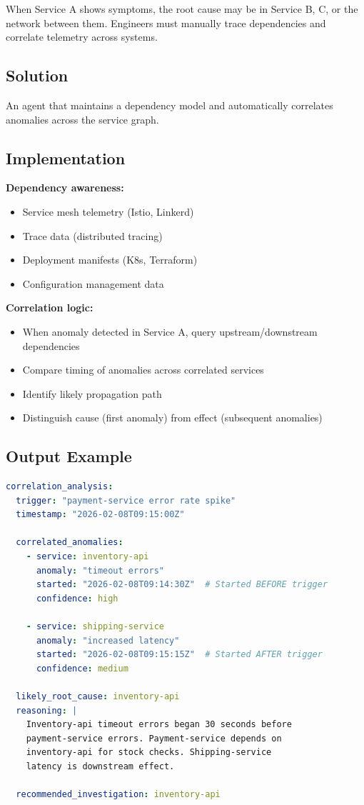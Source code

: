 When Service A shows symptoms, the root cause may be in Service B, C, or the network between them. Engineers must manually trace dependencies and correlate telemetry across systems.

\subsection{Solution}

An agent that maintains a dependency model and automatically correlates anomalies across the service graph.

\subsection{Implementation}

\textbf{Dependency awareness:}
\begin{itemize}
    \item Service mesh telemetry (Istio, Linkerd)
    \item Trace data (distributed tracing)
    \item Deployment manifests (K8s, Terraform)
    \item Configuration management data
\end{itemize}

\textbf{Correlation logic:}
\begin{itemize}
    \item When anomaly detected in Service A, query upstream/downstream dependencies
    \item Compare timing of anomalies across correlated services
    \item Identify likely propagation path
    \item Distinguish cause (first anomaly) from effect (subsequent anomalies)
\end{itemize}

\subsection{Output Example}

\begin{lstlisting}[language=yaml,caption={Correlation Analysis Output}]
correlation_analysis:
  trigger: "payment-service error rate spike"
  timestamp: "2026-02-08T09:15:00Z"

  correlated_anomalies:
    - service: inventory-api
      anomaly: "timeout errors"
      started: "2026-02-08T09:14:30Z"  # Started BEFORE trigger
      confidence: high

    - service: shipping-service
      anomaly: "increased latency"
      started: "2026-02-08T09:15:15Z"  # Started AFTER trigger
      confidence: medium

  likely_root_cause: inventory-api
  reasoning: |
    Inventory-api timeout errors began 30 seconds before
    payment-service errors. Payment-service depends on
    inventory-api for stock checks. Shipping-service
    latency is downstream effect.

  recommended_investigation: inventory-api
\end{lstlisting}

